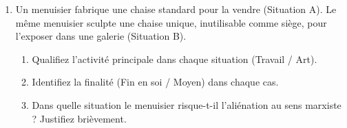 \documentclass[11pt]{article}
\begin{document}
\begin{exercice}
\begin{enumerate}
    \item Un menuisier fabrique une chaise standard pour la vendre (Situation A). Le même menuisier sculpte une chaise unique, inutilisable comme siège, pour l'exposer dans une galerie (Situation B).
    \begin{enumerate}
        \item Qualifiez l'activité principale dans chaque situation (Travail / Art).
        \item Identifiez la finalité (Fin en soi / Moyen) dans chaque cas.
        \item Dans quelle situation le menuisier risque-t-il l'aliénation au sens marxiste ? Justifiez brièvement.
    \end{enumerate}
\end{enumerate}
\end{exercice}
\end{document}

